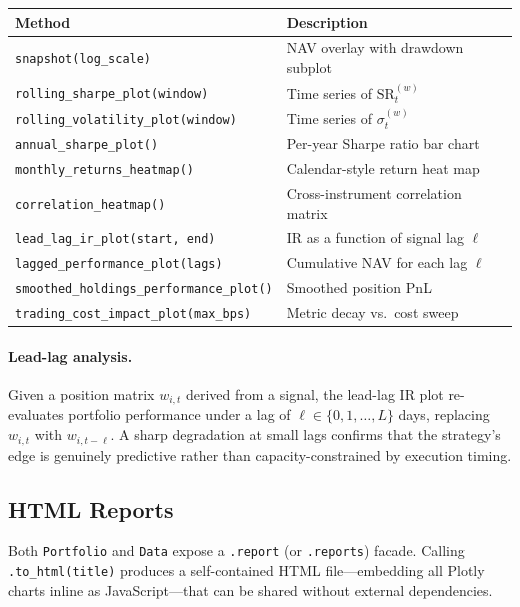 \documentclass[11pt,a4paper]{article}
\begin{document}
\begin{center}
\begin{tabular}{@{}ll@{}}
\toprule
Method & Description \\
\midrule
\texttt{snapshot(log\_scale)} & NAV overlay with drawdown subplot \\
\texttt{rolling\_sharpe\_plot(window)} & Time series of $\mathrm{SR}_t^{(w)}$ \\
\texttt{rolling\_volatility\_plot(window)} & Time series of $\sigma_t^{(w)}$ \\
\texttt{annual\_sharpe\_plot()} & Per-year Sharpe ratio bar chart \\
\texttt{monthly\_returns\_heatmap()} & Calendar-style return heat map \\
\texttt{correlation\_heatmap()} & Cross-instrument correlation matrix \\
\texttt{lead\_lag\_ir\_plot(start, end)} & IR as a function of signal lag $\ell$ \\
\texttt{lagged\_performance\_plot(lags)} & Cumulative NAV for each lag $\ell$ \\
\texttt{smoothed\_holdings\_performance\_plot()} & Smoothed position PnL \\
\texttt{trading\_cost\_impact\_plot(max\_bps)} & Metric decay vs.\ cost sweep \\
\bottomrule
\end{tabular}
\end{center}

\paragraph{Lead-lag analysis.}
Given a position matrix $w_{i,t}$ derived from a signal, the lead-lag IR plot
re-evaluates portfolio performance under a lag of $\ell \in \{0,1,\ldots,L\}$
days, replacing $w_{i,t}$ with $w_{i,t-\ell}$.  A sharp degradation at small
lags confirms that the strategy's edge is genuinely predictive rather than
capacity-constrained by execution timing.

\subsection{HTML Reports}

Both \texttt{Portfolio} and \texttt{Data} expose a \texttt{.report} (or
\texttt{.reports}) facade.  Calling \texttt{.to\_html(title)} produces a
self-contained HTML file—embedding all Plotly charts inline as JavaScript—that
can be shared without external dependencies.
\end{document}
